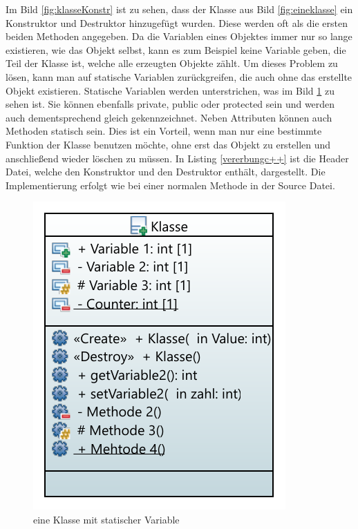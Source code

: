  Im Bild \ref{fig:klasseKonstr} ist zu sehen, dass der Klasse aus Bild \ref{fig:eineklasse} ein \glqq Konstruktor\grqq{} und \glqq Destruktor\grqq{} hinzugefügt wurden. Diese werden oft als die ersten beiden Methoden angegeben.
  Da die Variablen eines Objektes immer nur so lange existieren, wie das Objekt selbst, kann es zum Beispiel keine Variable geben, die Teil der Klasse ist, welche alle erzeugten Objekte zählt. Um dieses Problem zu lösen, kann man auf statische Variablen  zurückgreifen, die auch ohne das erstellte Objekt existieren. Statische Variablen werden unterstrichen, was im Bild \ref{fig:klassestatic} zu sehen ist. Sie können ebenfalls   \glqq private\grqq{}, \glqq public\grqq{} oder  \glqq protected\grqq{} sein und werden auch dementsprechend gleich gekennzeichnet. Neben Attributen können auch Methoden statisch sein. Dies ist ein Vorteil, wenn man nur eine bestimmte Funktion der Klasse benutzen möchte, ohne erst das Objekt zu erstellen und anschließend wieder löschen zu müssen. In Listing \ref{vererbungc++} ist die Header Datei, welche den Konstruktor und den Destruktor enthält, dargestellt. Die Implementierung erfolgt wie bei einer normalen Methode in der Source Datei. 
  \begin{figure}[H]
 	\centering
 	 	\includegraphics[scale=1.2]{bilder/pdfvorlagen/model3}
 	\caption[eine Klasse mit statischer Variable]{eine Klasse mit statischer Variable}
 	\label{fig:klassestatic}
 \end{figure}
\cite{HelmutErlenkotter.}
\cite{Prof.Dr.AlfredIrber.}
\cite{Krau.}
